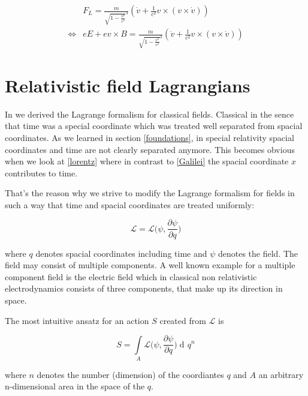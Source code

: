 \documentclass{article}
\DeclareMathOperator{\dd}{d\!}
\begin{document}
\begin{align}
    &F_L = \frac{m}{\sqrt{1 - \frac{v^2}{c^2}}^3} (\dot{v} + \frac{1}{c^2} v \times (v \times \dot{v})) \nonumber \\
    \iff & eE + e v \times B = \frac{m}{\sqrt{1 - \frac{v^2}{c^2}}^3} (\dot{v} + \frac{1}{c^2} v \times (v \times \dot{v}))
\end{align}


\section{Relativistic field Lagrangians}

In \cite{LagrangeOfField} we derived the Lagrange formalism for classical fields.
Classical in the sence that time was a special coordinate which was treated well separated from spacial coordinates.
As we learned in section \ref{foundations}, in special relativity spacial coordinates and time are not clearly separated anymore.
This becomes obvious when we look at \ref{lorentz} where in contrast to \ref{Galilei} the spacial coordinate $x$ contributes to time.

That's the reason why we strive to modify the Lagrange formalism for fields in such a way that time and spacial coordinates are treated uniformly:

\begin{equation} \label{relativisticFielLagrangian}
    \mathcal{L} = \mathcal{L}\bigg(\psi,\frac{\partial \psi}{\partial q}\bigg)
\end{equation}

where $q$ denotes spacial coordinates including time and $\psi$ denotes the field.
The field may consist of multiple components.
A well known example for a multiple component field is the electric field which in classical non relativistic electrodynamics consists of three components, that make up its direction in space.

The most intuitive ansatz for an action $S$ created from $\mathcal{L}$ is

\begin{equation} \label{relativisticFielAction}
    S = \int\limits_{A} \mathcal{L}\bigg(\psi,\frac{\partial \psi}{\partial q}\bigg) \dd q^{n}
\end{equation}

where $n$ denotes the number (dimension) of the coordiantes $q$ and $A$ an arbitrary n-dimensional area in the space of the $q$.
\\
\end{document}
